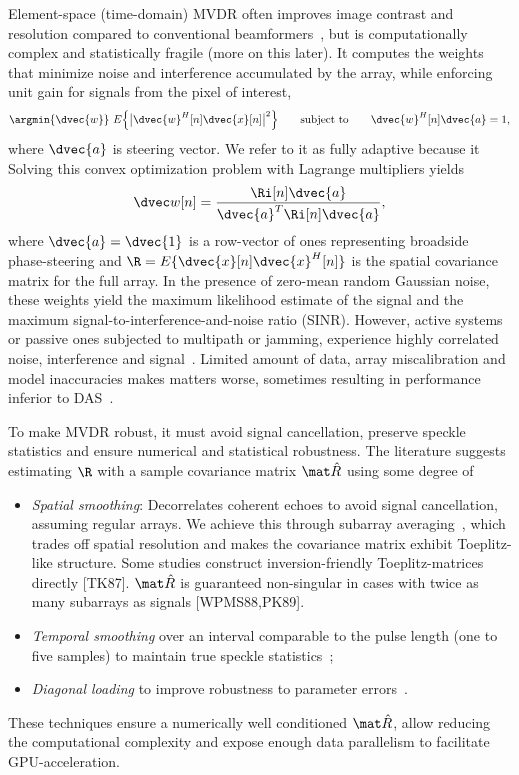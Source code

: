 {Element-space (time-domain) MVDR often improves image contrast and resolution compared to conventional beamformers~\cite{Benitz1997,Synnevag2007,Blomberg2013,Blomberg2012a,Dursun2009,Lo2004}, but is computationally complex and statistically fragile (more on this later). It computes the weights that minimize noise and interference accumulated by the array, while enforcing unit gain for signals from the pixel of interest,
%
\begin{gather}
\argmin{\dvec{w}}\ E\Big\{\big|\dvec{w}^H[n]\dvec{x}[n]\big|^2\Big\} \qquad\text{subject to}\qquad \dvec{w}^H[n]\dvec{a} = 1, \label{2_eq_mvdr_def}
\end{gather}
%
where $\dvec{a}$ is steering vector. We refer to it as fully adaptive because it  Solving this convex optimization problem with Lagrange multipliers yields
%
\begin{gather}
\dvec w[n] = \frac{\Ri[n]\dvec{a}}{\dvec{a}^T\Ri[n]\dvec{a}}, \label{2_eq_weights}
\end{gather}
%
where $\dvec{a}=\dvec{1}$ is a row-vector of ones representing broadside phase-steering and $\R=E\{\dvec{x}[n]\dvec{x}^H[n]\}$ is the spatial covariance matrix for the full array. In the presence of zero-mean random Gaussian noise, these weights yield the maximum likelihood estimate of the signal and the maximum signal-to-interference-and-noise ratio (SINR). However, active systems or passive ones subjected to multipath or jamming, experience highly correlated noise, interference and signal~\cite{Widrow1982}. Limited amount of data, array miscalibration and model inaccuracies makes matters worse, sometimes resulting in performance inferior to DAS~\cite{Li2006robust}. 

To make MVDR robust, it must avoid signal cancellation, preserve speckle statistics and ensure numerical and statistical robustness. The literature suggests estimating $\R$ with a sample covariance matrix $\eR$ using some degree of
%
\begin{itemize}
\item \emph{Spatial smoothing}: Decorrelates coherent echoes to avoid signal cancellation, assuming regular arrays. We achieve this through subarray averaging~\cite{Kailath1985,Johnson1993}, which trades off spatial resolution and makes the covariance matrix exhibit Toeplitz-like structure. Some studies construct inversion-friendly Toeplitz-matrices directly [TK87]. $\eR$ is guaranteed non-singular in cases with twice as many subarrays as signals [WPMS88,PK89]. 
\item \emph{Temporal smoothing} over an interval comparable to the pulse length (one to five samples) to maintain true speckle statistics~\cite{Synnevag2009};
\item \emph{Diagonal loading} to improve robustness to parameter errors~\cite{Cox1987,Maksym1979,VanTrees2002}.
\end{itemize}%
%
These techniques ensure a numerically well conditioned $\eR$, allow reducing the computational complexity and expose enough data parallelism to facilitate GPU-acceleration. 

}
